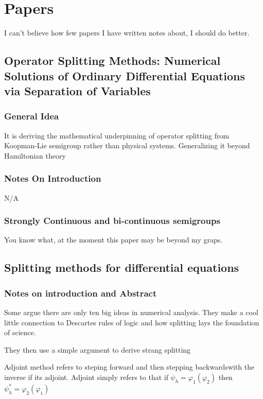 \chapter{Papers}
I can't believe how few papers I have written notes about, I should do better.
\section{Operator Splitting Methods: Numerical Solutions of Ordinary Differential Equations via Separation of Variables}

\subsection{General Idea}

It is deriving the mathematical underpinning of operator splitting from Koopman-Lie semigroup rather than physical systems. Generalizing it beyond Hamiltonian theory


\subsection{Notes On Introduction}
N/A

\subsection{Strongly Continuous and bi-continuous semigroups}


You know what, at the moment this paper may be beyond my graps.


\section{Splitting methods for differential equations}

\subsection{Notes on introduction and Abstract}

Some argue there are only ten big ideas in numerical analysis. They make a cool little connection to Descartes rules of logic and how splitting lays the foundation of science.

They then use a simple argument to derive strang splitting

Adjoint method refers to steping forward and then stepping backwardswith the inverse if its adjoint. Adjoint simply refers to that if $\psi_h = \varphi_1(\varphi_2)$ then $\psi^*_h = \varphi_2(\varphi_1)$

